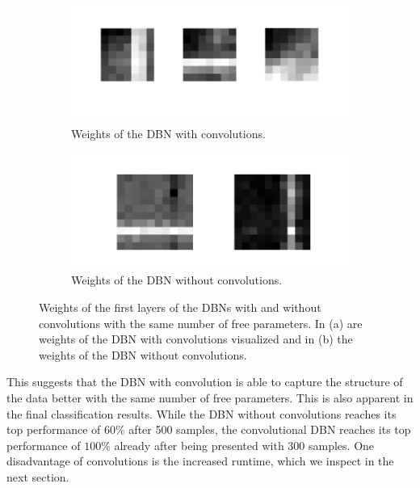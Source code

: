 \begin{figure}[h!]
	\centering
	\begin{subfigure}[t]{.45\textwidth}
  		\centering
  		\includegraphics[width=.9\linewidth]{imgs/cvsnc/wc.png}
  		\caption{Weights of the DBN with convolutions.}
  		\label{fig:sub1}
	\end{subfigure}%
	\begin{subfigure}[t]{.45\textwidth}
  		\centering
  		\includegraphics[width=.9\linewidth]{imgs/cvsnc/wnc.png}
  		\caption{Weights of the DBN without convolutions.}
  		\label{fig:sub2}
	\end{subfigure}
	\caption[Weights of the first layers of the DBNs with and without convolutions with the same number of free parameters.]{Weights of the first layers of the DBNs with and without convolutions with the same number of free parameters. In (a) are weights of the DBN with convolutions visualized and in (b) the weights of the DBN without convolutions.}
	\label{fig:wwoconwconv}
\end{figure}


This suggests that the DBN with convolution is able to capture the structure of the data better with the same number of free parameters. 
This is also apparent in the final classification results.
While the DBN without convolutions reaches its top performance of $60 \%$ after 500 samples, the convolutional DBN reaches its top performance of $100 \%$ already after being presented with 300 samples.
One disadvantage of convolutions is the increased runtime, which we inspect in the next section.

